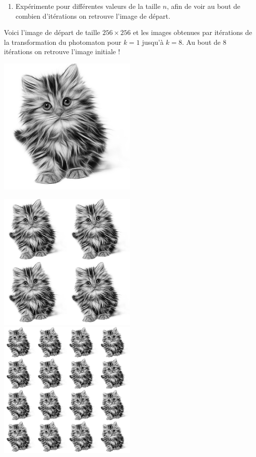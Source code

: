 \documentclass[11pt,class=report,crop=false]{standalone}
\begin{document}
\begin{activite}
\begin{enumerate}
  \item Expérimente pour différentes valeurs de la taille $n$, afin de voir au bout de combien d'itérations on retrouve l'image de départ.
  
\end{enumerate}

Voici l'image de départ de taille $256 \times 256$ et les images obtenues par itérations de la transformation du photomaton pour $k=1$ jusqu'à $k=8$. Au bout de $8$ itérations on retrouve l'image initiale !
\begin{center}
\includegraphics[scale=\myscale,scale=0.4]{images_fiche/chat_gimp_new_photo_0.png}
\end{center}
\begin{center}
\includegraphics[scale=\myscale,scale=0.3]{images_fiche/chat_gimp_new_photo_1.png}\qquad
\includegraphics[scale=\myscale,scale=0.3]{images_fiche/chat_gimp_new_photo_2.png}\qquad

\end{center}
\end{activite}
\end{document}
